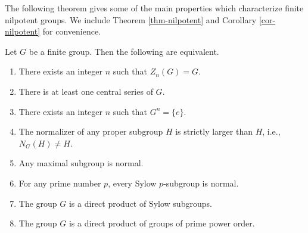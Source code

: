 The following theorem gives some of the main properties which characterize  finite nilpotent groups. We include Theorem \ref{thm-nilpotent} and Corollary \ref{cor-nilpotent} for convenience.
\begin{theorem}
	Let $G$ be a finite group. Then the following are equivalent.
	\begin{enumerate}[(1)]
		\item There exists an integer $n$ such that $Z_n(G)=G$.
		\item There is at least one central series of $G$.
		\item There exists an integer $n$ such that $G^n=\{e\}$.
		\item The normalizer of any proper subgroup $H$ is strictly larger than $H$, i.e., $N_G(H) \neq  H$.
		\item Any maximal subgroup is normal.
		\item For any prime number $p$, every Sylow $p$-subgroup is normal.
		\item The group $G$ is a direct product of Sylow subgroups.
		\item The group $G$ is a direct product of groups of prime power order.
	\end{enumerate}
\end{theorem}
